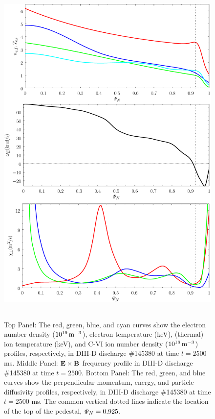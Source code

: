\documentclass[12pt,prb,aps]{revtex4-1}
\begin{document}
\begin{figure}
\includegraphics[height=7in]{fig3.pdf}
\caption{Top Panel: The red, green, blue, and cyan curves show the electron number density ($10^{19}\,{\rm m}^{-3}$),
electron temperature (keV), (thermal) ion temperature (keV), and
 C-VI ion number density  ($10^{18}\,{\rm m}^{-3}$)  profiles, respectively,  in  DIII-D discharge \#145380 at time $t=2500$ ms. Middle Panel:  
 ${\bf E}\times {\bf B}$ frequency profile in  DIII-D discharge \#145380 at time $t=2500$. Bottom Panel: The red, green, and blue curves show
 the perpendicular momentum, energy, and particle diffusivity profiles, respectively, 
 in  DIII-D discharge \#145380 at time $t=2500$ ms.
The   common vertical dotted lines indicate the location of the top
of the pedestal, ${\mit\Psi}_N=0.925$.} \label{fig3}
\end{figure}
\end{document}
